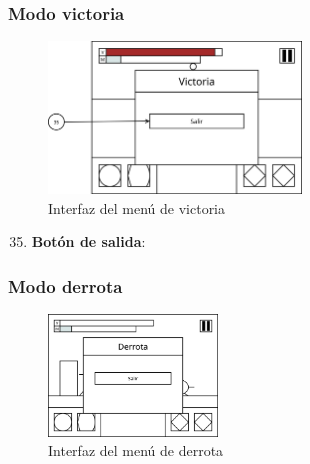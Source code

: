 \subsubsection{Modo victoria}
\begin{figure}[H]
    \centering
    \includegraphics[width=0.6\textwidth]{5-Cuerpo/Chapter5/I8.png} %
    \caption{Interfaz del menú de victoria}
    \label{fig:Interface_Victoria}
\end{figure}
\begin{enumerate}\setcounter{enumi}{34}
    \item \textbf{Botón de salida}:
\end{enumerate}

\subsubsection{Modo derrota}
\begin{figure}[H]
    \centering
    \includegraphics[width=0.4\textwidth]{5-Cuerpo/Chapter5/I9.png} %
    \caption{Interfaz del menú de derrota}
    \label{fig:Interface_Derrota}
\end{figure}


